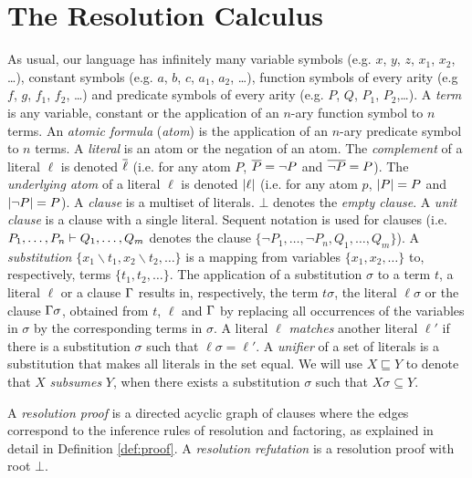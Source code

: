 \section{The Resolution Calculus}
\label{sec:res}

As usual, our language has infinitely many variable symbols (e.g. $x$, $y$, $z$, $x_1$, $x_2$, \ldots), constant symbols (e.g. $a$, $b$, $c$, $a_1$, $a_2$, \ldots), function symbols of every arity (e.g $f$, $g$, $f_1$, $f_2$, \ldots) and predicate symbols of every arity (e.g. $P$, $Q$, $P_1$, $P_2$,\ldots). A \emph{term} is any variable, constant or the application of an $n$-ary function symbol to $n$ terms.
An \emph{atomic formula} (\emph{atom}) is the application of an $n$-ary predicate symbol to $n$ terms. A \emph{literal} is an atom or the negation of an atom. The
\emph{complement} of a literal $\ell$ is denoted $\overline{\ell}$ (i.e. for any atom $P$,
$\overline{P} = \neg P$ and $\overline{\neg P} = P$). The \emph{underlying atom} of a literal $\ell$ is denoted $\lvert\ell\rvert$ (i.e. for any atom $p$, $\lvert P\rvert = P$ and $\lvert\neg P\rvert = P$). A
\emph{clause} is a multiset of literals. $\bot$ denotes the \emph{empty clause}. A \emph{unit clause} is a clause with a single literal. Sequent notation is used for clauses (i.e. $P_1,\ldots,P_n \vdash Q_1,\ldots, Q_m$ denotes the clause $\{ \neg P_1,\ldots, \neg P_n, Q_1, \ldots, Q_m \}$).
A \emph{substitution} $\{ x_1\backslash t_1, x_2 \backslash t_2, \ldots \}$ is a mapping from variables $\{ x_1, x_2, \ldots \}$ to, respectively, terms $\{t_1, t_2, \ldots \}$. The application of a substitution $\sigma$ to a term $t$, a literal $\ell$ or a clause $\Gamma$ results in, respectively, the term $t \sigma$, the literal $\ell \sigma$ or the clause $\Gamma \sigma$, obtained from $t$, $\ell$ and $\Gamma$ by replacing all occurrences of the variables in $\sigma$ by the corresponding terms in $\sigma$. A literal $\ell$ \emph{matches} another literal $\ell'$ if there is a substitution $\sigma$ such that $\ell\sigma=\ell'$. A \emph{unifier} of a set of literals is a substitution that makes all literals in the set equal. We will use $X \sqsubseteq Y$ to denote that $X$ \emph{subsumes} $Y$, when there exists a substitution $\sigma$ such that $X\sigma \subseteq Y$.


A \emph{resolution proof} is a directed acyclic graph of clauses where the edges correspond to the inference rules of resolution and factoring, as explained in detail in Definition \ref{def:proof}. A \emph{resolution refutation} is a resolution proof with root $\bot$.

